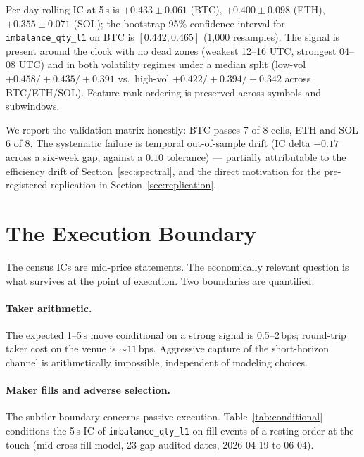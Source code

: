 \documentclass[11pt,a4paper]{article}
\theoremstyle{definition}
\theoremstyle{plain}
\newcommand{\feat}[1]{\texttt{#1}}
\begin{document}
Per-day rolling IC at 5\,s is $+0.433 \pm 0.061$ (BTC),
$+0.400 \pm 0.098$ (ETH), $+0.355 \pm 0.071$ (SOL); the bootstrap 95\%
confidence interval for \feat{imbalance\_qty\_l1} on BTC is
$[0.442, 0.465]$ (1{,}000 resamples). The signal is present around the
clock with no dead zones (weakest 12--16 UTC, strongest 04--08 UTC)
and in both volatility regimes under a median split (low-vol
$+0.458/+0.435/+0.391$ vs.\ high-vol $+0.422/+0.394/+0.342$ across
BTC/ETH/SOL). Feature rank ordering is preserved across symbols and
subwindows.

We report the validation matrix honestly: BTC passes 7 of 8 cells,
ETH and SOL 6 of 8. The systematic failure is temporal out-of-sample
drift (IC delta $-0.17$ across a six-week gap, against a $0.10$
tolerance) --- partially attributable to the efficiency drift of
Section~\ref{sec:spectral}, and the direct motivation for the
pre-registered replication in Section~\ref{sec:replication}.

\section{The Execution Boundary}\label{sec:boundary}

The census ICs are mid-price statements. The economically relevant
question is what survives at the point of execution. Two boundaries
are quantified.

\paragraph{Taker arithmetic.} The expected 1--5\,s move conditional on
a strong signal is 0.5--2\,bps; round-trip taker cost on the venue is
${\sim}11$\,bps. Aggressive capture of the short-horizon channel is
arithmetically impossible, independent of modeling choices.

\paragraph{Maker fills and adverse selection.} The subtler boundary
concerns passive execution. Table~\ref{tab:conditional} conditions
the 5\,s IC of \feat{imbalance\_qty\_l1} on fill events of a resting
order at the touch (mid-cross fill model, 23 gap-audited dates,
2026-04-19 to 06-04).
\end{document}
